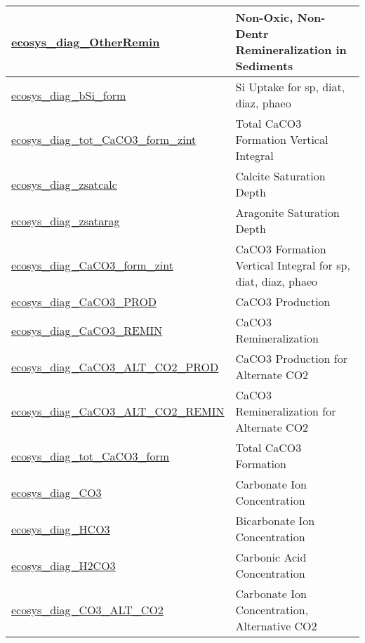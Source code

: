 {\begin{center}
\begin{longtable}{| p{2.0in} | p{4.0in} |}
    \hyperref[subsec:var_sec_forcing_ecosys_diag_OtherRemin]{ecosys\_diag\_OtherRemin} & Non-Oxic, Non-Dentr Remineralization in Sediments \\
    \hline
    \hyperref[subsec:var_sec_forcing_ecosys_diag_bSi_form]{ecosys\_diag\_bSi\_form} & Si Uptake for sp, diat, diaz, phaeo \\
    \hline
    \hyperref[subsec:var_sec_forcing_ecosys_diag_tot_CaCO3_form_zint]{ecosys\_diag\_tot\_CaCO3\_form\_\-zint} & Total CaCO3 Formation Vertical Integral \\
    \hline
    \hyperref[subsec:var_sec_forcing_ecosys_diag_zsatcalc]{ecosys\_diag\_zsatcalc} & Calcite Saturation Depth \\
    \hline
    \hyperref[subsec:var_sec_forcing_ecosys_diag_zsatarag]{ecosys\_diag\_zsatarag} & Aragonite Saturation Depth \\
    \hline
    \hyperref[subsec:var_sec_forcing_ecosys_diag_CaCO3_form_zint]{ecosys\_diag\_CaCO3\_form\_zint} & CaCO3 Formation Vertical Integral for sp, diat, diaz, phaeo \\
    \hline
    \hyperref[subsec:var_sec_forcing_ecosys_diag_CaCO3_PROD]{ecosys\_diag\_CaCO3\_PROD} & CaCO3 Production \\
    \hline
    \hyperref[subsec:var_sec_forcing_ecosys_diag_CaCO3_REMIN]{ecosys\_diag\_CaCO3\_REMIN} & CaCO3 Remineralization \\
    \hline
    \hyperref[subsec:var_sec_forcing_ecosys_diag_CaCO3_ALT_CO2_PROD]{ecosys\_diag\_CaCO3\_ALT\_\-CO2\_PROD} & CaCO3 Production for Alternate CO2 \\
    \hline
    \hyperref[subsec:var_sec_forcing_ecosys_diag_CaCO3_ALT_CO2_REMIN]{ecosys\_diag\_CaCO3\_ALT\_\-CO2\_REMIN} & CaCO3 Remineralization for Alternate CO2 \\
    \hline
    \hyperref[subsec:var_sec_forcing_ecosys_diag_tot_CaCO3_form]{ecosys\_diag\_tot\_CaCO3\_form} & Total CaCO3 Formation \\
    \hline
    \hyperref[subsec:var_sec_forcing_ecosys_diag_CO3]{ecosys\_diag\_CO3} & Carbonate Ion Concentration \\
    \hline
    \hyperref[subsec:var_sec_forcing_ecosys_diag_HCO3]{ecosys\_diag\_HCO3} & Bicarbonate Ion Concentration \\
    \hline
    \hyperref[subsec:var_sec_forcing_ecosys_diag_H2CO3]{ecosys\_diag\_H2CO3} & Carbonic Acid Concentration \\
    \hline
    \hyperref[subsec:var_sec_forcing_ecosys_diag_CO3_ALT_CO2]{ecosys\_diag\_CO3\_ALT\_CO2} & Carbonate Ion Concentration, Alternative CO2 \\

\end{longtable}
\end{center}}
